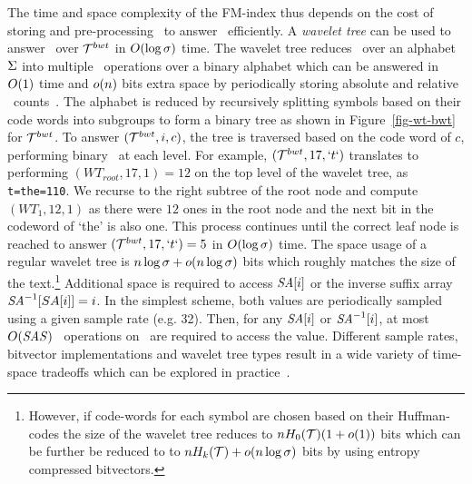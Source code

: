 The time and space complexity of the FM-index thus depends on the cost of storing
and pre-processing \colbwt\ to answer \rankop\ efficiently. A {\it wavelet tree}
can be used to answer \rankop\ over $\mathcal{T}^{bwt}$ in $O(\log \sigma)$ time.
The wavelet tree reduces \rankop\ over an alphabet $\Sigma$ into multiple
\rankop\ operations over a binary alphabet which can be answered 
in $O(1)$ time and $o(n)$ bits extra space by periodically storing absolute
and relative \rankop\ counts~\cite{m-fsttcs96}. The alphabet is
reduced by recursively splitting symbols based on their code words into subgroups to 
form a binary tree as shown in Figure~\ref{fig-wt-bwt} for $\mathcal{T}^{bwt}$. To answer
\rankop$(\mathcal{T}^{bwt},i,c)$, the tree is traversed based on the code word of $c$, performing
binary \rankop\ at each level. For example, \rankop$(\mathcal{T}^{bwt},17,`t`)$ translates
to performing \rankop$(WT_{root},17,1)=12$ on the top level of the wavelet 
tree, as {\tt t=the=110}. We recurse to the right subtree of the root node and
compute \rankop$(WT_{1},12,1)$ as there were $12$ ones in the root node and
the next bit in the codeword of `the' is also one. This process continues until 
the correct leaf node is reached to answer \rankop$(\mathcal{T}^{bwt},17,`t`)=5$ in 
$O(\log \sigma)$ time. The space usage of a regular wavelet tree is
$n \log \sigma + o(n \log \sigma)$ bits which roughly
matches the size of the text.\footnote{However, if code-words for each symbol are chosen
based on their Huffman-codes the size of the wavelet tree reduces to $nH_0(\mathcal{T})(1 + o(1))$
bits which can be further be reduced to to $n H_k(\mathcal{T})+o(n \log \sigma)$ bits by using 
entropy compressed bitvectors.} Additional space is required to access $\mbox{\emph{SA}}[i]$
or the inverse suffix array $\mbox{\emph{SA}}^{-1}[SA[i]]=i$. In the simplest scheme, both 
values are periodically sampled using a given sample rate \SASAMPLE (e.g. 32). Then, 
for any $\mbox{\emph{SA}}[i]$ or $\mbox{\emph{SA}}^{-1}[i]$, at most $O(\mbox{\emph{SAS}})$ \rankop\
operations on \colbwt\ are required to access the value.
Different sample rates, bitvector implementations and wavelet tree types result
in a wide variety of time-space tradeoffs which can be explored 
in practice~\cite{gbmp2014sea}.

